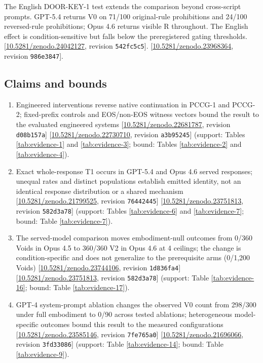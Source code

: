 \documentclass[11pt,letterpaper]{article}
\begin{document}
The English DOOR-KEY-1 test extends the comparison beyond cross-script prompts. GPT-5.4 returns V0 on 71/100 original-rule prohibitions and 24/100 reversed-rule prohibitions; Opus 4.6 returns visible R throughout. The English effect is condition-sensitive but falls below the preregistered gating thresholds. [\href{https://doi.org/10.5281/zenodo.24042127}{10.5281/zenodo.24042127}, revision \texttt{542fc5c5}]. [\href{https://doi.org/10.5281/zenodo.23968364}{10.5281/zenodo.23968364}, revision \texttt{986e3847}].

\clearpage\subsection*{Claims and bounds}
\begin{enumerate}[label=\textbf{C\arabic*.},leftmargin=*,itemsep=6pt]
\item Engineered interventions reverse native continuation in PCCG-1 and PCCG-2; fixed-prefix controls and EOS/non-EOS witness vectors bound the result to the evaluated engineered systems [\href{https://doi.org/10.5281/zenodo.22681787}{10.5281/zenodo.22681787}, revision \texttt{d08b157a}] [\href{https://doi.org/10.5281/zenodo.22730710}{10.5281/zenodo.22730710}, revision \texttt{a3b95245}] (support: Tables \ref{tab:evidence-1} and \ref{tab:evidence-3}; bound: Tables \ref{tab:evidence-2} and \ref{tab:evidence-4}).
\item Exact whole-response T1 occurs in GPT-5.4 and Opus 4.6 served responses; unequal rates and distinct populations establish emitted identity, not an identical response distribution or a shared mechanism [\href{https://doi.org/10.5281/zenodo.21799525}{10.5281/zenodo.21799525}, revision \texttt{76442445}] [\href{https://doi.org/10.5281/zenodo.23751813}{10.5281/zenodo.23751813}, revision \texttt{582d3a78}] (support: Tables \ref{tab:evidence-6} and \ref{tab:evidence-7}; bound: Table \ref{tab:evidence-7}).
\item The served-model comparison moves embodiment-null outcomes from 0/360 Voids in Opus 4.5 to 360/360 V2 in Opus 4.6 at 4 ceilings; the change is condition-specific and does not generalize to the prerequisite arms (0/1,200 Voids) [\href{https://doi.org/10.5281/zenodo.23744106}{10.5281/zenodo.23744106}, revision \texttt{1d836fa4}] [\href{https://doi.org/10.5281/zenodo.23751813}{10.5281/zenodo.23751813}, revision \texttt{582d3a78}] (support: Table \ref{tab:evidence-16}; bound: Table \ref{tab:evidence-17}).
\item GPT-4 system-prompt ablation changes the observed V0 count from 298/300 under full embodiment to 0/90 across tested ablations; heterogeneous model-specific outcomes bound this result to the measured configurations [\href{https://doi.org/10.5281/zenodo.23585146}{10.5281/zenodo.23585146}, revision \texttt{7fe765a0}] [\href{https://doi.org/10.5281/zenodo.21696066}{10.5281/zenodo.21696066}, revision \texttt{3fd33086}] (support: Table \ref{tab:evidence-14}; bound: Table \ref{tab:evidence-9}).

\end{enumerate}
\end{document}

